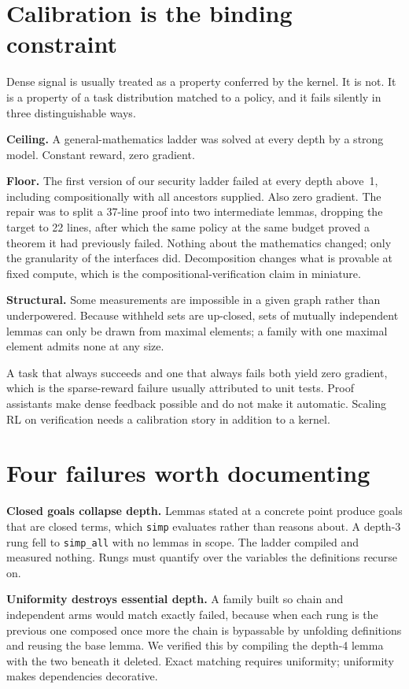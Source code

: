 \documentclass[10pt]{article}
\begin{document}
\section{Calibration is the binding constraint}
\label{sec:cal}

Dense signal is usually treated as a property conferred by the kernel. It is
not. It is a property of a task distribution matched to a policy, and it fails
silently in three distinguishable ways.

\textbf{Ceiling.} A general-mathematics ladder was solved at every depth by a
strong model. Constant reward, zero gradient.

\textbf{Floor.} The first version of our security ladder failed at every depth
above~1, including compositionally with all ancestors supplied. Also zero
gradient. The repair was to split a 37-line proof into two intermediate lemmas,
dropping the target to 22 lines, after which the same policy at the same budget
proved a theorem it had previously failed. Nothing about the mathematics
changed; only the granularity of the interfaces did. Decomposition changes what
is provable at fixed compute, which is the compositional-verification claim in
miniature.

\textbf{Structural.} Some measurements are impossible in a given graph rather
than underpowered. Because withheld sets are up-closed, sets of mutually
independent lemmas can only be drawn from maximal elements; a family with one
maximal element admits none at any size.

A task that always succeeds and one that always fails both yield zero gradient,
which is the sparse-reward failure usually attributed to unit tests. Proof
assistants make dense feedback possible and do not make it automatic. Scaling RL
on verification needs a calibration story in addition to a kernel.

\section{Four failures worth documenting}
\label{sec:neg}

\textbf{Closed goals collapse depth.} Lemmas stated at a concrete point produce
goals that are closed terms, which \texttt{simp} evaluates rather than reasons
about. A depth-3 rung fell to \texttt{simp\_all} with no lemmas in scope. The
ladder compiled and measured nothing. Rungs must quantify over the variables the
definitions recurse on.

\textbf{Uniformity destroys essential depth.} A family built so chain and
independent arms would match exactly failed, because when each rung is the
previous one composed once more the chain is bypassable by unfolding
definitions and reusing the base lemma. We verified this by compiling the
depth-4 lemma with the two beneath it deleted. Exact matching requires
uniformity; uniformity makes dependencies decorative.
\end{document}
